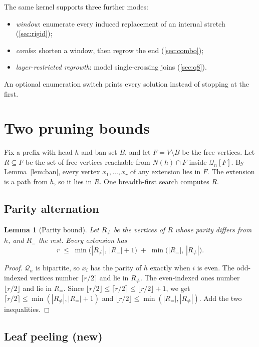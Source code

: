 \documentclass[11pt,a4paper]{article}
\newtheorem{lemma}[theorem]{Lemma}
\theoremstyle{definition}
\newcommand{\Q}{\mathcal{Q}}
\newcommand{\N}{N}
\begin{document}
The same kernel supports three further modes:
\begin{itemize}[leftmargin=*]
\item \emph{window}: enumerate every induced replacement of an internal stretch (\cref{sec:rigid});
\item \emph{combo}: shorten a window, then regrow the end (\cref{sec:combo});
\item \emph{layer-restricted regrowth}: model single-crossing joins (\cref{sec:q8}).
\end{itemize}
An optional enumeration switch prints every solution instead of stopping at the first.

\section{Two pruning bounds}\label{sec:bounds}

Fix a prefix with head $h$ and ban set $B$, and let $F=V\setminus B$ be the free vertices. Let $R\subseteq F$ be the set of free vertices reachable from $\N(h)\cap F$ inside $\Q_n[F]$. By Lemma~\ref{lem:ban}, every vertex $x_1,\dots,x_r$ of any extension lies in $F$. The extension is a path from $h$, so it lies in $R$. One breadth-first search computes $R$.

\subsection{Parity alternation}

\begin{lemma}[Parity bound]\label{lem:parity}
Let $R_{\neq}$ be the vertices of $R$ whose parity differs from $h$, and $R_{=}$ the rest. Every extension has
\[
r\;\le\;\min\bigl(|R_{\neq}|,\,|R_{=}|+1\bigr)\;+\;\min\bigl(|R_{=}|,\,|R_{\neq}|\bigr).
\]
\end{lemma}

\begin{proof}
$\Q_n$ is bipartite, so $x_i$ has the parity of $h$ exactly when $i$ is even. The odd-indexed vertices number $\lceil r/2\rceil$ and lie in $R_{\neq}$. The even-indexed ones number $\lfloor r/2\rfloor$ and lie in $R_{=}$. Since $\lfloor r/2\rfloor\le\lceil r/2\rceil\le\lfloor r/2\rfloor+1$, we get $\lceil r/2\rceil\le\min(|R_{\neq}|,|R_=|+1)$ and $\lfloor r/2\rfloor\le\min(|R_=|,|R_{\neq}|)$. Add the two inequalities.
\end{proof}

\subsection{Leaf peeling (new)}
\end{document}
